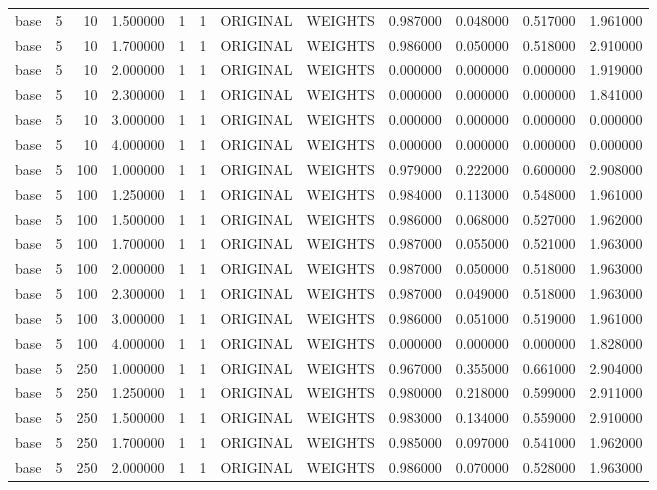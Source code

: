 \begin{tabular}{lrrrllllrrrr}
base & 5 & 10 & 1.500000 & 1 & 1 & ORIGINAL & WEIGHTS & 0.987000 & 0.048000 & 0.517000 & 1.961000 \\
base & 5 & 10 & 1.700000 & 1 & 1 & ORIGINAL & WEIGHTS & 0.986000 & 0.050000 & 0.518000 & 2.910000 \\
base & 5 & 10 & 2.000000 & 1 & 1 & ORIGINAL & WEIGHTS & 0.000000 & 0.000000 & 0.000000 & 1.919000 \\
base & 5 & 10 & 2.300000 & 1 & 1 & ORIGINAL & WEIGHTS & 0.000000 & 0.000000 & 0.000000 & 1.841000 \\
base & 5 & 10 & 3.000000 & 1 & 1 & ORIGINAL & WEIGHTS & 0.000000 & 0.000000 & 0.000000 & 0.000000 \\
base & 5 & 10 & 4.000000 & 1 & 1 & ORIGINAL & WEIGHTS & 0.000000 & 0.000000 & 0.000000 & 0.000000 \\
base & 5 & 100 & 1.000000 & 1 & 1 & ORIGINAL & WEIGHTS & 0.979000 & 0.222000 & 0.600000 & 2.908000 \\
base & 5 & 100 & 1.250000 & 1 & 1 & ORIGINAL & WEIGHTS & 0.984000 & 0.113000 & 0.548000 & 1.961000 \\
base & 5 & 100 & 1.500000 & 1 & 1 & ORIGINAL & WEIGHTS & 0.986000 & 0.068000 & 0.527000 & 1.962000 \\
base & 5 & 100 & 1.700000 & 1 & 1 & ORIGINAL & WEIGHTS & 0.987000 & 0.055000 & 0.521000 & 1.963000 \\
base & 5 & 100 & 2.000000 & 1 & 1 & ORIGINAL & WEIGHTS & 0.987000 & 0.050000 & 0.518000 & 1.963000 \\
base & 5 & 100 & 2.300000 & 1 & 1 & ORIGINAL & WEIGHTS & 0.987000 & 0.049000 & 0.518000 & 1.963000 \\
base & 5 & 100 & 3.000000 & 1 & 1 & ORIGINAL & WEIGHTS & 0.986000 & 0.051000 & 0.519000 & 1.961000 \\
base & 5 & 100 & 4.000000 & 1 & 1 & ORIGINAL & WEIGHTS & 0.000000 & 0.000000 & 0.000000 & 1.828000 \\
base & 5 & 250 & 1.000000 & 1 & 1 & ORIGINAL & WEIGHTS & 0.967000 & 0.355000 & 0.661000 & 2.904000 \\
base & 5 & 250 & 1.250000 & 1 & 1 & ORIGINAL & WEIGHTS & 0.980000 & 0.218000 & 0.599000 & 2.911000 \\
base & 5 & 250 & 1.500000 & 1 & 1 & ORIGINAL & WEIGHTS & 0.983000 & 0.134000 & 0.559000 & 2.910000 \\
base & 5 & 250 & 1.700000 & 1 & 1 & ORIGINAL & WEIGHTS & 0.985000 & 0.097000 & 0.541000 & 1.962000 \\
base & 5 & 250 & 2.000000 & 1 & 1 & ORIGINAL & WEIGHTS & 0.986000 & 0.070000 & 0.528000 & 1.963000 \\

\end{tabular}
